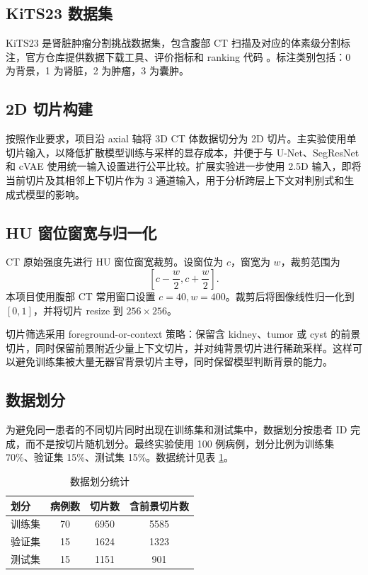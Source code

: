 \documentclass[lang=cn,11pt,a4paper]{elegantpaper}
\begin{document}
\subsection{KiTS23 数据集}

KiTS23 是肾脏肿瘤分割挑战数据集，包含腹部 CT 扫描及对应的体素级分割标注，官方仓库提供数据下载工具、评价指标和 ranking 代码 \cite{kits23repo}。标注类别包括：0 为背景，1 为肾脏，2 为肿瘤，3 为囊肿。

\subsection{2D 切片构建}

按照作业要求，项目沿 axial 轴将 3D CT 体数据切分为 2D 切片。主实验使用单切片输入，以降低扩散模型训练与采样的显存成本，并便于与 U-Net、SegResNet 和 cVAE 使用统一输入设置进行公平比较。扩展实验进一步使用 2.5D 输入，即将当前切片及其相邻上下切片作为 3 通道输入，用于分析跨层上下文对判别式和生成式模型的影响。

\subsection{HU 窗位窗宽与归一化}

CT 原始强度先进行 HU 窗位窗宽裁剪。设窗位为 $c$，窗宽为 $w$，裁剪范围为
\[
[c-\frac{w}{2}, c+\frac{w}{2}].
\]
本项目使用腹部 CT 常用窗口设置 $c=40,w=400$。裁剪后将图像线性归一化到 $[0,1]$，并将切片 resize 到 $256\times256$。

切片筛选采用 foreground-or-context 策略：保留含 kidney、tumor 或 cyst 的前景切片，同时保留前景附近少量上下文切片，并对纯背景切片进行稀疏采样。这样可以避免训练集被大量无器官背景切片主导，同时保留模型判断背景的能力。

\subsection{数据划分}

为避免同一患者的不同切片同时出现在训练集和测试集中，数据划分按患者 ID 完成，而不是按切片随机划分。最终实验使用 100 例病例，划分比例为训练集 70\%、验证集 15\%、测试集 15\%。数据统计见表 \ref{tab:data_statistics}。

\begin{table}[H]
\centering
\caption{数据划分统计}
\label{tab:data_statistics}
\begin{tabular}{lccc}
\toprule
划分 & 病例数 & 切片数 & 含前景切片数 \\
\midrule
训练集 & 70 & 6950 & 5585 \\
验证集 & 15 & 1624 & 1323 \\
测试集 & 15 & 1151 & 901 \\
\bottomrule
\end{tabular}
\end{table}
\end{document}
